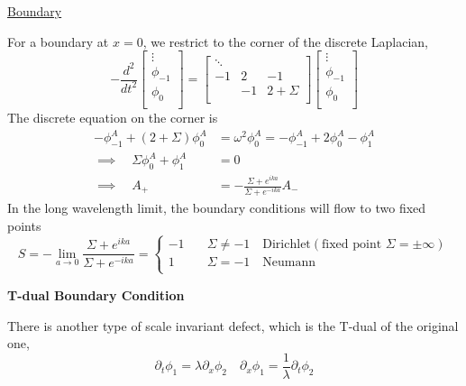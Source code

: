 \documentclass{article}
\begin{document}
\underline{Boundary}

For a boundary at $x =0$, we restrict to the corner of the discrete Laplacian,
\begin{equation}
-\frac{d^2}{dt^2} 
\begin{bmatrix}
\vdots\\
\phi_{-1}\\
\phi_0\\
\end{bmatrix}
=
\begin{bmatrix}
\ddots & & \\
-1 & 2 & -1\\
  &-1 & 2+\Sigma\\
\end{bmatrix}
\begin{bmatrix}
\vdots\\
\phi_{-1}\\
\phi_0\\
\end{bmatrix}
\end{equation}
The discrete equation on the corner is
\begin{equation}
\begin{aligned}
-\phi_{-1}^A + ( 2 + \Sigma ) \phi_0^A  &= \omega^2 \phi_0^A = -\phi_{-1}^A + 2 \phi_0^A  - \phi_1^A \\
\implies \quad \Sigma \phi_0^A + \phi_1^A &= 0 \\
\implies \quad A_{+} &= - \frac{\Sigma + e^{ika}}{ \Sigma + e^{-ika} } A_{-} 
\end{aligned}
\end{equation}
In the long wavelength limit, the boundary conditions will flow to two fixed points
\begin{equation}
S = - \lim_{a\rightarrow 0 } \frac{\Sigma + e^{ika}}{ \Sigma + e^{-ika} } = 
\left\lbrace
\begin{aligned}
  -1 & \quad \Sigma \ne -1  \quad \text{Dirichlet}(\text{fixed point } \Sigma = \pm \infty)\\
   1&  \quad \Sigma =-1 \quad \text{Neumann}\\
\end{aligned} \right. 
\end{equation}

{\bf T-dual Boundary Condition}

There is another type of scale invariant defect, which is the T-dual of the original one, 
\begin{equation}
\partial_t \phi_1 = \lambda \partial_x \phi_2 \quad \partial_x \phi_1 = \frac{1}{\lambda} \partial_t \phi_2 
\end{equation}
\end{document}
